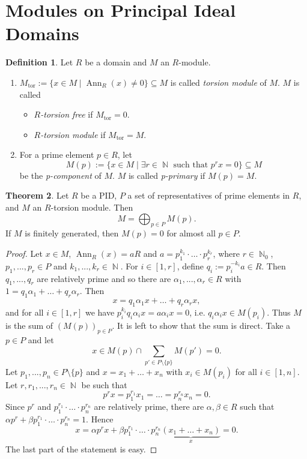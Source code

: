 \documentclass[12pt,a4paper]{report}
\theoremstyle{definition}
\newtheorem{theorem}{Theorem}[chapter] %
\newtheorem{defn}[theorem]{Definition}
\theoremstyle{num.custom-title}
\DeclareMathOperator{\tor}{tor}
\DeclareMathOperator{\Ann}{Ann}
\DeclareMathOperator{\N}{\mathbb{N}}
\DeclareMathOperator{\sm}{\setminus}
\DeclareMathOperator{\sse}{\subseteq}
\begin{document}
\section{Modules on Principal Ideal Domains}

\begin{defn}
Let $R$ be a domain and $M$ an $R$-module.
\begin{enumerate}
\item $M_{\tor} := \{x \in M \mid \Ann_R(x) \neq 0\} \sse M$ is called \emph{torsion module} of $M$. $M$ is called
\begin{itemize}
\item \emph{$R$-torsion free} if $M_{\tor}=0$.
\item \emph{$R$-torsion module} if $M_{\tor} = M$.
\end{itemize}
\item For a prime element $p \in R$, let
\[
M(p) := \{x \in M \mid \exists r \in \N \text{ such that } p^r x = 0\} \sse M
\]
be the \emph{p-component} of $M$. $M$ is called \emph{p-primary} if $M(p)=M$.
\end{enumerate}
\end{defn}

\begin{theorem}
Let $R$ be a PID, $P$ a set of representatives of prime elements in $R$, and $M$ an $R$-torsion module. Then
\[
M = \bigoplus_{p \in P} M(p).
\]
If $M$ is finitely generated, then $M(p)=0$ for almost all $p \in P$.
\begin{proof}
Let $x \in M$, $\Ann_R(x)=aR$ and $a=p_1^{k_1} \cdot \ldots \cdot p_r^{k_r}$, where $r \in \N_0$, $p_1,...,p_r \in P$ and $k_1,...,k_r \in \N$. For $i \in [1,r]$, define $q_i := p_i^{-k_i} a \in R$. Then $q_1,...,q_r$ are relatively prime and so there are $\alpha_1,...,\alpha_r \in R$ with $1=q_1\alpha_1 + \ldots + q_r \alpha_r$. Then 
\[
x=q_1 \alpha_1 x + \ldots + q_r \alpha_r x,
\]
and for all $i \in [1,r]$ we have $p_i^{k_i} q_i \alpha_i x = a \alpha_i x = 0$, i.e. $q_i \alpha_i x \in M(p_i)$. Thus $M$ is the sum of $(M(p))_{p \in P}$. It is left to show that the sum is direct. Take a $p \in P$ and let
\[
x \in M(p) \cap \sum_{p' \in P \sm \{p\}} M(p') = 0.
\]
Let $p_1,...,p_n \in P \sm \{p\}$ and $x=x_1+\ldots+x_n$ with $x_i \in M(p_i)$ for all $i \in [1,n]$. Let $r,r_1,...,r_n \in \N$ be such that
\[
p^r x = p_1^{r_1} x_1 = \ldots = p_n^{r_n} x_n = 0.
\]
Since $p^r$ and $p_1^{r_1} \cdot \ldots \cdot p_n^{r_n}$ are relatively prime, there are $\alpha, \beta \in R$ such that $\alpha p^r + \beta p_1^{r_1} \cdot \ldots \cdot p_n^{r_n} = 1$. Hence
\[
x = \alpha p^r x + \beta p_1^{r_1} \cdot \ldots \cdot p_n^{r_n} \underbrace{(x_1+\ldots+x_n)}_{x} = 0.
\]
The last part of the statement is easy.
\end{proof}
\end{theorem}
\end{document}
